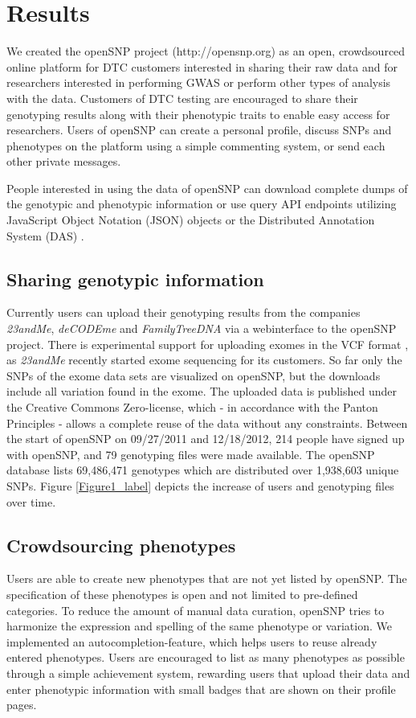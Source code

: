 \documentclass[10pt]{article}
\newcommand{\bastian}[1]{\authornote{BG: #1}}
\begin{document}
\section*{Results}

We created the openSNP project (http://opensnp.org) as an open, crowdsourced online platform for DTC customers interested in sharing their raw data and for researchers interested in performing GWAS or perform other types of analysis with the data. 
Customers of DTC testing are encouraged to share their genotyping results along with their phenotypic traits to enable easy access for researchers.
Users of openSNP can create a personal profile, discuss SNPs and phenotypes on the platform using a simple commenting system, or send each other private messages.

People interested in using the data of openSNP can download complete dumps of the genotypic and phenotypic information or use query API endpoints utilizing JavaScript Object Notation (JSON) objects or the Distributed Annotation System (DAS) \cite{Dowell2001}. 


\subsection*{Sharing genotypic information}
Currently users can upload their genotyping results from the companies \textit{23andMe}, \textit{deCODEme }and \textit{FamilyTreeDNA} via a webinterface to the openSNP 
project. There is experimental support for uploading exomes in the VCF format \cite{Danecek01082011}, as \textit{23andMe} recently started exome sequencing for its customers. So far only the SNPs of the exome data sets are visualized on openSNP, but the downloads include all variation found in the exome.
The uploaded data is published under the Creative Commons Zero-license, 
which - in accordance with the Panton Principles \cite{10.1371/journal.pbio.1001195} - 
allows a complete reuse of the data without any constraints.
Between the start of openSNP on 09/27/2011 and 12/18/2012, 214 people have signed 
up with openSNP, and 79 genotyping files were made available. The openSNP 
database lists 69,486,471 genotypes which are distributed over 1,938,603 unique SNPs.
Figure \ref{Figure1_label} depicts the increase of users and genotyping files over time.\bastian{update all numbers}


\subsection*{Crowdsourcing phenotypes}
Users are able to create new phenotypes that are not yet 
listed by openSNP. 
The specification of these phenotypes is open and not limited 
to pre-defined categories. To reduce the amount of manual data curation, openSNP tries to harmonize 
the expression and spelling of the same phenotype or variation. We implemented an 
autocompletion-feature, which helps users to reuse already entered phenotypes.
Users are encouraged to list as many phenotypes as possible through a simple 
achievement system, rewarding users that upload their data and enter phenotypic 
information with small badges that are shown on their profile pages.
\end{document}
